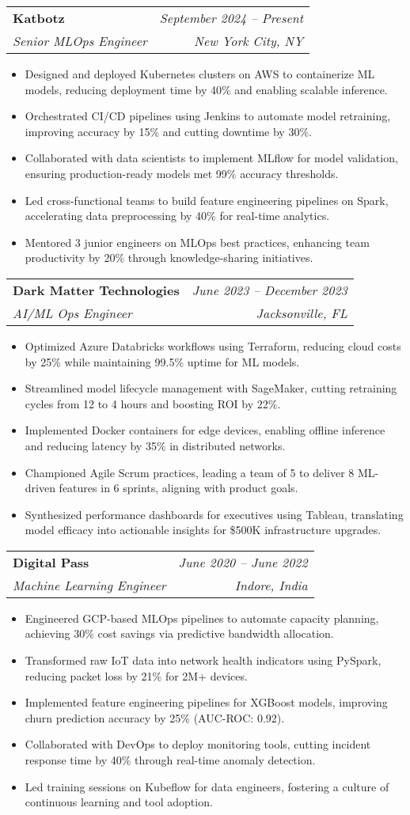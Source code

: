 \documentclass[letterpaper,10pt]{article}
\makeatletter
\newcommand{\resumeItem}[1]{
  \item\small{
    {#1 \vspace{-1.5pt}}
  }
}
\newcommand{\resumeSubheading}[4]{
  \vspace{-2pt}\item
    \begin{tabular*}{0.97\textwidth}[t]{l@{\extracolsep{\fill}}r}
      \textbf{#1} & #2 \\
      \textit{\small#3} & \textit{\small #4} \\
    \end{tabular*}\vspace{-5pt}
}
\newcommand{\resumeItemListStart}{\begin{itemize}[leftmargin=0.15in]}
\newcommand{\resumeItemListEnd}{\end{itemize}\vspace{-5pt}}
\makeatother
\begin{document}
\resumeSubheading
{Katbotz}{\textit{September 2024 -- Present}}
{Senior MLOps Engineer}{New York City, NY}
\resumeItemListStart
    \resumeItem{Designed and deployed Kubernetes clusters on AWS to containerize ML models, reducing deployment time by 40\% and enabling scalable inference.}
    \resumeItem{Orchestrated CI/CD pipelines using Jenkins to automate model retraining, improving accuracy by 15\% and cutting downtime by 30\%.}
    \resumeItem{Collaborated with data scientists to implement MLflow for model validation, ensuring production-ready models met 99\% accuracy thresholds.}
    \resumeItem{Led cross-functional teams to build feature engineering pipelines on Spark, accelerating data preprocessing by 40\% for real-time analytics.}
    \resumeItem{Mentored 3 junior engineers on MLOps best practices, enhancing team productivity by 20\% through knowledge-sharing initiatives.}
\resumeItemListEnd

\resumeSubheading
{Dark Matter Technologies}{\textit{June 2023 -- December 2023}}
{AI/ML Ops Engineer}{Jacksonville, FL}
\resumeItemListStart
    \resumeItem{Optimized Azure Databricks workflows using Terraform, reducing cloud costs by 25\% while maintaining 99.5\% uptime for ML models.}
    \resumeItem{Streamlined model lifecycle management with SageMaker, cutting retraining cycles from 12 to 4 hours and boosting ROI by 22\%.}
    \resumeItem{Implemented Docker containers for edge devices, enabling offline inference and reducing latency by 35\% in distributed networks.}
    \resumeItem{Championed Agile Scrum practices, leading a team of 5 to deliver 8 ML-driven features in 6 sprints, aligning with product goals.}
    \resumeItem{Synthesized performance dashboards for executives using Tableau, translating model efficacy into actionable insights for \$500K infrastructure upgrades.}
\resumeItemListEnd

\resumeSubheading
{Digital Pass}{\textit{June 2020 -- June 2022}}
{Machine Learning Engineer}{Indore, India}
\resumeItemListStart
    \resumeItem{Engineered GCP-based MLOps pipelines to automate capacity planning, achieving 30\% cost savings via predictive bandwidth allocation.}
    \resumeItem{Transformed raw IoT data into network health indicators using PySpark, reducing packet loss by 21\% for 2M+ devices.}
    \resumeItem{Implemented feature engineering pipelines for XGBoost models, improving churn prediction accuracy by 25\% (AUC-ROC: 0.92).}
    \resumeItem{Collaborated with DevOps to deploy monitoring tools, cutting incident response time by 40\% through real-time anomaly detection.}
    \resumeItem{Led training sessions on Kubeflow for data engineers, fostering a culture of continuous learning and tool adoption.}
\resumeItemListEnd
\end{document}
